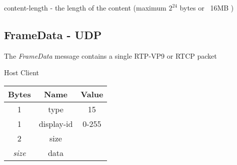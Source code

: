 content-length -  the length of the content  (maximum $2^{24}$ bytes or ~16MB )\\

\subsection{FrameData - UDP}

The \emph{FrameData} message contains a single RTP-VP9 or RTCP packet

\begin{center}
    Host \textrightarrow Client\\
    \begin{tabular}{|c|c|c|}
        \hline
        \textbf{Bytes} & \textbf{Name} & \textbf{Value} \\
        \hline
        1              & type          & 15             \\
        \hline
        1              & display-id    & 0-255          \\
        \hline
        2              & size          &                \\
        \hline
        \emph{size}    & data          &                \\
        \hline
    \end{tabular}
\end{center}